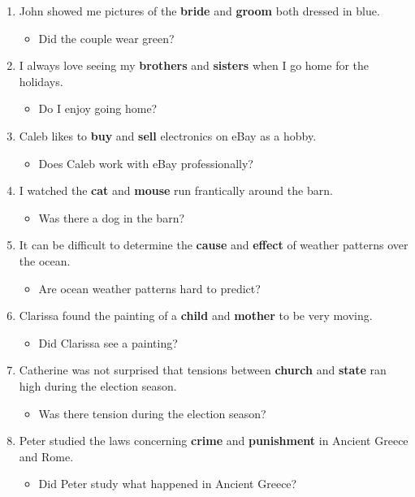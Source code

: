 \documentclass[authoryear]{elsarticle}
\begin{document}
\begin{enumerate}
\item John showed me pictures of the \textbf{bride} and \textbf{groom} both dressed in blue.	\begin{itemize} \item Did the couple wear green?\end{itemize}
\item I always love seeing my \textbf{brothers} and \textbf{sisters} when I go home for the holidays.	\begin{itemize} \item Do I enjoy going home?\end{itemize}
\item Caleb likes to \textbf{buy} and \textbf{sell} electronics on eBay as a hobby.	\begin{itemize} \item Does Caleb work with eBay professionally?\end{itemize}
\item I watched the \textbf{cat} and \textbf{mouse} run frantically around the barn.	\begin{itemize} \item Was there a dog in the barn?\end{itemize}
\item It can be difficult to determine the \textbf{cause} and \textbf{effect} of weather patterns over the ocean.	\begin{itemize} \item Are ocean weather patterns hard to predict?\end{itemize}
\item Clarissa found the painting of a \textbf{child} and \textbf{mother} to be very moving.	\begin{itemize} \item Did Clarissa see a painting?\end{itemize}
\item Catherine was not surprised that tensions between \textbf{church} and \textbf{state} ran high during the election season.	\begin{itemize} \item Was there tension during the election season?\end{itemize}
\item Peter studied the laws concerning \textbf{crime} and \textbf{punishment} in Ancient Greece and Rome.	\begin{itemize} \item Did Peter study what happened in Ancient Greece?\end{itemize}

\end{enumerate}
\end{document}
